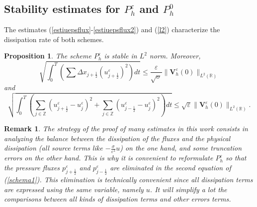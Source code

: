 \documentclass[a4paper,french,english,10pt]{article}
\newcommand\eps{\varepsilon}
\newcommand\V{\mathbf{V}}
\newtheorem{proposition}[theorem]{Proposition}
\newtheorem{remark}[theorem]{Remark}
\begin{document}

 \subsection{Stability  estimates for $P_h^\varepsilon$ and $P_h^0$}

The  estimates (\ref{estiuepsflux}-\ref{estiuepsflux2}) and (\ref{l2}) characterize the dissipation rate 
of both schemes.

\begin{proposition}\label{prodentrgosse}
The  scheme $P_h^\eps$
is stable in $L^2$ norm. Moreover, 
\begin{equation}\label{estiuepsflux}
\sqrt{
\int_0^T \left( \sum \Delta x_{j+\frac12}  ( u_{j+\frac12 }^\eps)^2 \right)dt
}
\leq
\frac{\eps}{\sqrt{\sigma}}
  \|\V^{\eps}_h(0)\|_{L^2(\mathbb{R})}
\end{equation}
and
\begin{equation}\label{estiuepsflux2}
 \sqrt{
\int_0^T
\left(
\sum_{j\in \mathbb{Z}} 
{
(u_{j+\frac12 }^{\eps}-u^{\eps}_j)^2 }
 +\sum_{j\in \mathbb{Z}} 
{
(u_{j-\frac12 }^{\eps}-u^{\eps}_j)^2 }
\right)dt }
\leq \sqrt \eps  \|\V^{\eps}_h(0)\|_{L^2(\mathbb{R})}.
\end{equation}
\end{proposition}
\begin{remark}
The strategy of the proof of many estimates in this work
consists in analyzing the balance
between the dissipation of the fluxes and the physical dissipation (all 
 source terms like 
$-\frac\sigma{\eps^2}u$) on the one hand, and some truncation errors
on the other hand.
This is why it is  convenient
to reformulate $P_h^\eps$
so that   the pressure fluxes 
$p_{j+\frac12 }^{\eps}$ and $p_{j-\frac12 }^{\eps}$ are eliminated in the second
equation of (\ref{schema1}). This elimination is technically convenient since
all dissipation terms are expressed using the same variable, namely $u$.
It will simplify a lot the comparisons between
all kinds of dissipation terms and other errors terms.
\end{remark}
\end{document}
